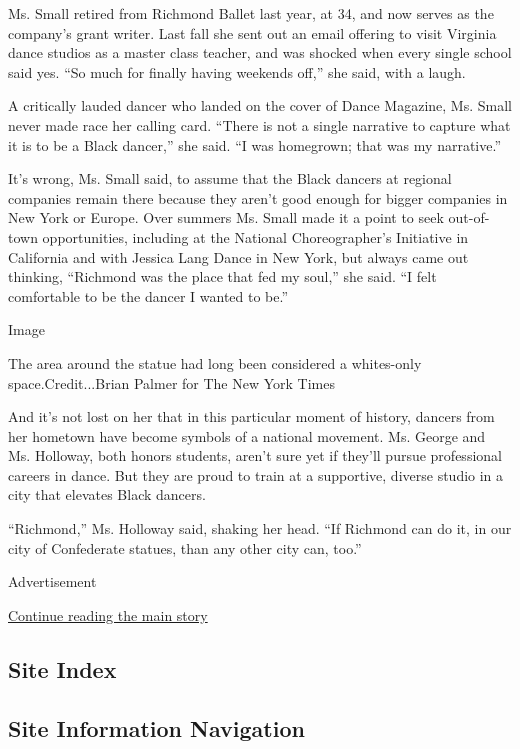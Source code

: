 Ms. Small retired from Richmond Ballet last year, at 34, and now serves
as the company's grant writer. Last fall she sent out an email offering
to visit Virginia dance studios as a master class teacher, and was
shocked when every single school said yes. ``So much for finally having
weekends off,'' she said, with a laugh.

A critically lauded dancer who landed on the cover of Dance Magazine,
Ms. Small never made race her calling card. ``There is not a single
narrative to capture what it is to be a Black dancer,'' she said. ``I
was homegrown; that was my narrative.''

It's wrong, Ms. Small said, to assume that the Black dancers at regional
companies remain there because they aren't good enough for bigger
companies in New York or Europe. Over summers Ms. Small made it a point
to seek out-of-town opportunities, including at the National
Choreographer's Initiative in California and with Jessica Lang Dance in
New York, but always came out thinking, ``Richmond was the place that
fed my soul,'' she said. ``I felt comfortable to be the dancer I wanted
to be.''

Image

The area around the statue had long been considered a whites-only
space.Credit...Brian Palmer for The New York Times

And it's not lost on her that in this particular moment of history,
dancers from her hometown have become symbols of a national movement.
Ms. George and Ms. Holloway, both honors students, aren't sure yet if
they'll pursue professional careers in dance. But they are proud to
train at a supportive, diverse studio in a city that elevates Black
dancers.

``Richmond,'' Ms. Holloway said, shaking her head. ``If Richmond can do
it, in our city of Confederate statues, than any other city can, too.''

Advertisement

\protect\hyperlink{after-bottom}{Continue reading the main story}

\hypertarget{site-index}{%
\subsection{Site Index}\label{site-index}}

\hypertarget{site-information-navigation}{%
\subsection{Site Information
Navigation}\label{site-information-navigation}}

